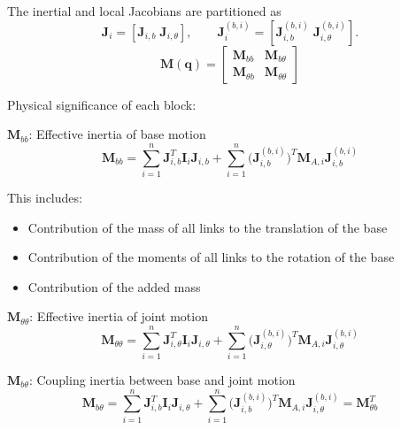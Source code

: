 \documentclass[12pt,a4paper]{report}
\begin{document}
The inertial and local Jacobians are partitioned as
\begin{equation}
\mathbf{J}_i = [\mathbf{J}_{i,b} \; \mathbf{J}_{i,\theta}],
\qquad
\mathbf{J}_i^{(b,i)} = [\mathbf{J}_{i,b}^{(b,i)} \; \mathbf{J}_{i,\theta}^{(b,i)}].
\end{equation}
\begin{equation}
\mathbf{M}(\mathbf{q}) = \begin{bmatrix}
\mathbf{M}_{bb} & \mathbf{M}_{b\theta} \\
\mathbf{M}_{\theta b} & \mathbf{M}_{\theta\theta}
\end{bmatrix}
\label{eq:old-118}
\end{equation}

Physical significance of each block:

\underline{$\mathbf{M}_{bb}$}: Effective inertia of base motion
\begin{equation}
\mathbf{M}_{bb}
=
\sum_{i=1}^{n} \mathbf{J}_{i,b}^T \mathbf{I}_i \mathbf{J}_{i,b}
+
\sum_{i=1}^{n} \bigl(\mathbf{J}_{i,b}^{(b,i)}\bigr)^T \mathbf{M}_{A,i} \mathbf{J}_{i,b}^{(b,i)}
\label{eq:old-119}
\end{equation}

This includes:
\begin{itemize}
    \item Contribution of the mass of all links to the translation of the base
    \item Contribution of the moments of all links to the rotation of the base
    \item Contribution of the added mass
\end{itemize}

\underline{$\mathbf{M}_{\theta\theta}$}: Effective inertia of joint motion
\begin{equation}
\mathbf{M}_{\theta\theta}
=
\sum_{i=1}^{n} \mathbf{J}_{i,\theta}^T \mathbf{I}_i \mathbf{J}_{i,\theta}
+
\sum_{i=1}^{n} \bigl(\mathbf{J}_{i,\theta}^{(b,i)}\bigr)^T \mathbf{M}_{A,i} \mathbf{J}_{i,\theta}^{(b,i)}
\label{eq:old-120}
\end{equation}

\underline{$\mathbf{M}_{b\theta}$}: Coupling inertia between base and joint motion
\begin{equation}
\mathbf{M}_{b\theta}
=
\sum_{i=1}^{n} \mathbf{J}_{i,b}^T \mathbf{I}_i \mathbf{J}_{i,\theta}
+
\sum_{i=1}^{n} \bigl(\mathbf{J}_{i,b}^{(b,i)}\bigr)^T \mathbf{M}_{A,i} \mathbf{J}_{i,\theta}^{(b,i)}
= \mathbf{M}_{\theta b}^T
\label{eq:old-121}
\end{equation}
\end{document}
